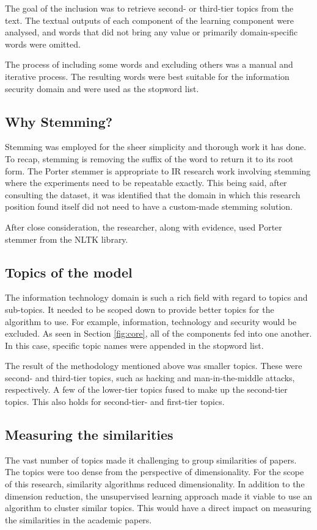The goal of the inclusion was to retrieve second- or third-tier topics from the text. The textual outputs of each component of the learning component were analysed, and words that did not bring any value or primarily domain-specific words were omitted.

The process of including some words and excluding others was a manual and iterative process. The resulting words were best suitable for the information security domain and were used as the stopword list.

\subsection{Why Stemming?} \label{ssec:stemming}

Stemming was employed for the sheer simplicity and thorough work it has done. To recap, stemming is removing the suffix of the word to return it to its root form. The Porter stemmer is appropriate to IR research work involving stemming where the experiments need to be repeatable exactly. This being said, after consulting the dataset, it was identified that the domain in which this research position found itself did not need to have a custom-made stemming solution.

After close consideration, the researcher, along with evidence, used Porter stemmer from the NLTK library.

\subsection{Topics of the model}

The information technology domain is such a rich field with regard to topics and sub-topics. It needed to be scoped down to provide better topics for the algorithm to use. For example, information, technology and security would be excluded. As seen in Section \ref{fig:core}, all of the components fed into one another. In this case, specific topic names were appended in the stopword list. 

The result of the methodology mentioned above was smaller topics. These were second- and third-tier topics, such as hacking and man-in-the-middle attacks, respectively. A few of the lower-tier topics fused to make up the second-tier topics. This also holds for second-tier- and first-tier topics.

\subsection{Measuring the similarities}
The vast number of topics made it challenging to group similarities of papers. The topics were too dense from the perspective of dimensionality. For the scope of this research, similarity algorithms reduced dimensionality. In addition to the dimension reduction, the unsupervised learning approach made it viable to use an algorithm to cluster similar topics. This would have a direct impact on measuring the similarities in the academic papers.

